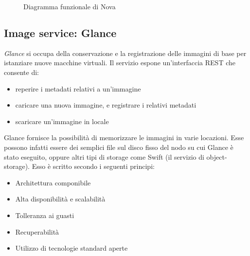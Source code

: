 \begin{figure}[H]
\centering
{}
\caption{Diagramma funzionale di Nova\cite{openstacknova}}\label{openstacknova}
\end{figure}

\subsection{Image service: Glance}
\textit{Glance} si occupa della conservazione e la registrazione delle immagini di base per istanziare nuove macchine virtuali.
Il servizio espone un'interfaccia REST che consente di:
\begin{itemize}
\item reperire i metadati relativi a un'immagine
\item caricare una nuova immagine, e registrare i relativi metadati
\item scaricare un'immagine in locale
\end{itemize}
Glance fornisce la possibilità di memorizzare le immagini in varie locazioni. Esse possono infatti essere dei semplici file sul disco fisso del nodo su cui Glance è stato eseguito, oppure altri tipi di storage come Swift (il servizio di object-storage).
Esso è scritto secondo i seguenti principi:
\begin{itemize}
\item Architettura componibile
\item Alta disponibilità e scalabilità
\item Tolleranza ai guasti
\item Recuperabilità
\item Utilizzo di tecnologie standard aperte
\end{itemize}

